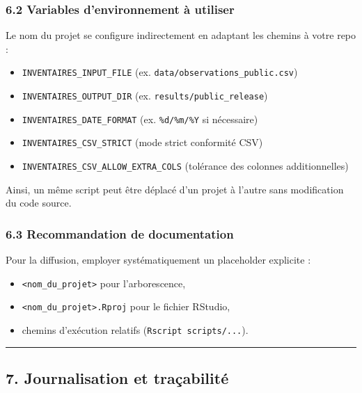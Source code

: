 \subsubsection{6.2 Variables d'environnement à
utiliser}\label{variables-denvironnement-uxe0-utiliser}

Le nom du projet se configure indirectement en adaptant les chemins à
votre repo :

\begin{itemize}
\tightlist
\item
  \texttt{INVENTAIRES\_INPUT\_FILE} (ex.
  \texttt{data/observations\_public.csv})
\item
  \texttt{INVENTAIRES\_OUTPUT\_DIR} (ex.
  \texttt{results/public\_release})
\item
  \texttt{INVENTAIRES\_DATE\_FORMAT} (ex. \texttt{\%d/\%m/\%Y} si
  nécessaire)
\item
  \texttt{INVENTAIRES\_CSV\_STRICT} (mode strict conformité CSV)
\item
  \texttt{INVENTAIRES\_CSV\_ALLOW\_EXTRA\_COLS} (tolérance des colonnes
  additionnelles)
\end{itemize}

Ainsi, un même script peut être déplacé d'un projet à l'autre sans
modification du code source.

\subsubsection{6.3 Recommandation de
documentation}\label{recommandation-de-documentation}

Pour la diffusion, employer systématiquement un placeholder explicite :

\begin{itemize}
\tightlist
\item
  \texttt{\textless{}nom\_du\_projet\textgreater{}} pour l'arborescence,
\item
  \texttt{\textless{}nom\_du\_projet\textgreater{}.Rproj} pour le
  fichier RStudio,
\item
  chemins d'exécution relatifs (\texttt{Rscript\ scripts/...}).
\end{itemize}

\begin{center}\rule{0.5\linewidth}{0.5pt}\end{center}

\subsection{7. Journalisation et
traçabilité}\label{journalisation-et-trauxe7abilituxe9}

